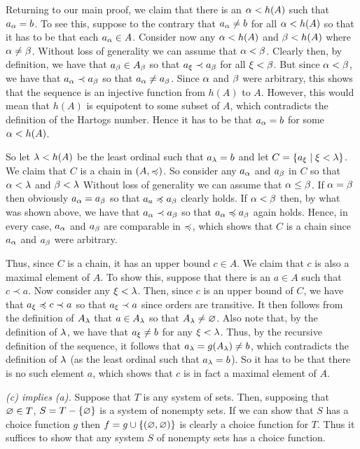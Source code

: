 \begin{questions}
{{      Returning to our main proof, we claim that there is an $\alpha < h(A)$ such that $a_\alpha = b$.
      To see this, suppose to the contrary that $a_\alpha \neq b$ for all $\alpha < h(A)$ so that it has to be that each $a_\alpha \in A$.
      Consider now any $\alpha < h(A)$ and $\beta < h(A)$ where $\alpha \neq \beta$.
      Without loss of generality we can assume that $\alpha < \beta$.
      Clearly then, by definition, we have that $a_\beta \in A_\beta$ so that $a_\xi \prec a_\beta$ for all $\xi < \beta$.
      But since $\alpha < \beta$, we have that $a_\alpha \prec a_\beta$ so that $a_\alpha \neq a_\beta$.
      Since $\alpha$ and $\beta$ were arbitrary, this shows that the sequence is an injective function from $h(A)$ to $A$.
      However, this would mean that $h(A)$ is equipotent to some subset of $A$, which contradicts the definition of the Hartogs number.
      Hence it has to be that $a_\alpha = b$ for some $\alpha < h(A)$.

      So let $\lambda < h(A)$ be the least ordinal such that $a_\lambda = b$ and let $C = \left\{ a_\xi \mid \xi < \lambda \right\}$.
      We claim that $C$ is a chain in $(A, \preccurlyeq)$.
      So consider any $a_\alpha$ and $a_\beta$ in $C$ so that $\alpha < \lambda$ and $\beta < \lambda$
      Without loss of generality we can assume that $\alpha \leq \beta$.
      If $\alpha = \beta$ then obviously $a_\alpha = a_\beta$ so that $a_a \preccurlyeq a_\beta$ clearly holds.
      If $\alpha < \beta$ then, by what was shown above, we have that $a_\alpha \prec a_\beta$ so that $a_\alpha \preccurlyeq a_\beta$ again holds.
      Hence, in every case, $a_\alpha$ and $a_\beta$ are comparable in $\preccurlyeq$, which shows that $C$ is a chain since $a_\alpha$ and $a_\beta$ were arbitrary.

      Thus, since $C$ is a chain, it has an upper bound $c \in A$.
      We claim that $c$ is also a maximal element of $A$.
      To show this, suppose that there is an $a \in A$ such that $c \prec a$.
      Now consider any $\xi < \lambda$.
      Then, since $c$ is an upper bound of $C$, we have that $a_\xi \preccurlyeq c \prec a$ so that $a_\xi \prec a$ since orders are transitive.
      It then follows from the definition of $A_\lambda$ that $a \in A_\lambda$ so that $A_\lambda \neq \varnothing$.
      Also note that, by the definition of $\lambda$, we have that $a_\xi \neq b$ for any $\xi < \lambda$.
      Thus, by the recursive definition of the sequence, it follows that $a_\lambda = g(A_\lambda) \neq b$, which contradicts the definition of $\lambda$ (as the least ordinal such that $a_\lambda = b$).
      So it has to be that there is no such element $a$, which shows that $c$ is in fact a maximal element of $A$.

      \emph{(c) implies (a).}
      Suppose that $T$ is any system of sets.
      Then, supposing that $\varnothing \in T$, $S = T - \left\{ \varnothing \right\}$ is a system of nonempty sets.
      If we can show that $S$ has a choice function $g$ then $f = g \cup \left\{ (\varnothing, \varnothing) \right\}$ is clearly a choice function for $T$.
      Thus it suffices to show that any system $S$ of nonempty sets has a choice function.

}}
\end{questions}
